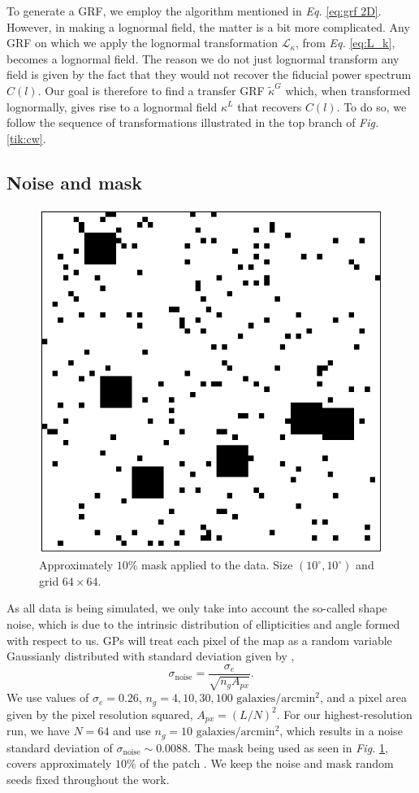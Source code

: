To generate a GRF, we employ the algorithm mentioned in \textit{Eq. }\eqref{eq:grf 2D}. However, in making a lognormal field, the matter is a bit more complicated. Any GRF on which we apply the lognormal transformation $\mathcal{L}_\kappa$, from \textit{Eq. }\eqref{eq:L_k}, becomes a lognormal field. The reason we do not just lognormal transform any field is given by the fact that they would not recover the fiducial power spectrum $C(l)$. Our goal is therefore to find a transfer GRF $\tilde{\kappa}^G$ which, when transformed lognormally, gives rise to a lognormal field $\kappa^L$ that recovers $C(l)$. To do so, we follow the sequence of transformations illustrated in the top branch of \textit{Fig. }\ref{tik:cw}.

\subsection{Noise and mask}
\begin{figure}[h]
    \centering
    \includegraphics[width=0.5\linewidth]{images/5_random_and_blocks_mask.pdf}
    \caption{Approximately $10\%$ mask applied to the data. Size $(10^{\circ},10^{\circ})$ and grid $64\times64$.}
    \label{fig:mask}
\end{figure}
As all data is being simulated, we only take into account the so-called shape noise, which is due to the intrinsic distribution of ellipticities and angle formed with respect to us. GPs will treat each pixel of the map as a random variable Gaussianly distributed with standard deviation given by \cite{noise},
\begin{equation}
    \sigma_\text{noise} = \frac{\sigma_e}{\sqrt{n_g A_{px}}}.
    \label{eq:noise}
\end{equation}
We use values of $\sigma_e=0.26$, $n_g= 4, 10, 30, 100 \text{ galaxies}/\text{arcmin}^2$, and a pixel area given by the pixel resolution squared, $A_{px}=(L/N)^2$. For our highest-resolution run, we have $N=64$ and use $n_g = 10 \text{ galaxies}/\text{arcmin}^2$, which results in a noise standard deviation of $\sigma_\text{noise} \sim 0.0088$. The mask being used as seen in \textit{Fig. }\ref{fig:mask}, covers approximately $10\%$ of the patch \cite{pixel}. We keep the noise and mask random seeds fixed throughout the work.

